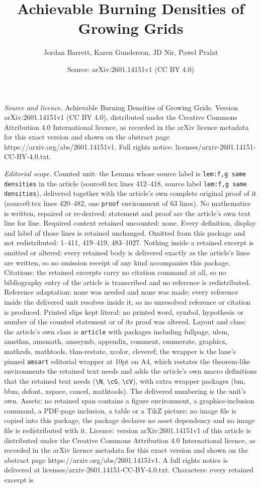 \documentclass[10pt,a4paper]{amsart}
\title[Achievable Burning Densities of Growing Grids]{Achievable Burning Densities of Growing Grids}
\author{Jordan Barrett, Karen Gunderson, JD Nir, Pawel Pralat}
\date{Source: arXiv:2601.14151v1 (CC BY 4.0)}
\begin{document}
\maketitle

\noindent\emph{Source and licence.} Achievable Burning Densities of Growing Grids. Version arXiv:2601.14151v1 (CC BY 4.0), distributed under the Creative Commons Attribution 4.0 International licence, as recorded in the arXiv licence metadata for this exact version and shown on the abstract page https://arxiv.org/abs/2601.14151v1. Full rights notice: licenses/arxiv-2601.14151-CC-BY-4.0.txt.\par\smallskip

\noindent\textit{Editorial scope.} Counted unit: the Lemma whose source label is \texttt{lem:f,g same densities} in the article (source0.tex lines 412--418, source label \texttt{lem:f,g same densities}), delivered together with the article's own complete original proof of it (source0.tex lines 420--482, one \texttt{proof} environment of 63 lines). No mathematics is written, repaired or re-derived: statement and proof are the article's own text line for line. Required context retained uncounted: none. Every definition, display and label of those lines is retained unchanged. Omitted from this package and not redistributed: 1--411, 419--419, 483--1027. Nothing inside a retained excerpt is omitted or altered: every retained body is delivered exactly as the article's lines are written, so no omission receipt of any kind accompanies this package. Citations: the retained excerpts carry no citation command at all, so no bibliography entry of the article is transcribed and no reference is redistributed. Reference adaptation: none was needed and none was made; every reference inside the delivered unit resolves inside it, so no unresolved reference or citation is produced. Printed slips kept literal: no printed word, symbol, hypothesis or number of the counted statement or of its proof was altered. Layout and class: the article's own class is \texttt{article} with packages including fullpage, ulem, amsthm, amsmath, amssymb, appendix, comment, enumerate, graphicx, mathrsfs, mathtools, thm-restate, xcolor, cleveref; the wrapper is the lane's pinned \texttt{amsart} editorial wrapper at 10pt on A4, which restates the theorem-like environments the retained text needs and adds the article's own macro definitions that the retained text needs (\texttt{\textbackslash N}, \texttt{\textbackslash cG}, \texttt{\textbackslash cV}), with extra wrapper packages (bm, bbm, dsfont, xspace, cancel, mathtools). The delivered numbering is the unit's own. Assets: no retained span contains a figure environment, a graphics-inclusion command, a PDF-page inclusion, a table or a TikZ picture; no image file is copied into this package, the package declares no asset dependency and no image file is redistributed with it. Licence: version arXiv:2601.14151v1 of this article is distributed under the Creative Commons Attribution 4.0 International licence, as recorded in the arXiv licence metadata for this exact version and shown on the abstract page https://arxiv.org/abs/2601.14151v1. A full rights notice is delivered at licenses/arxiv-2601.14151-CC-BY-4.0.txt. Characters: every retained excerpt is 
\end{document}
